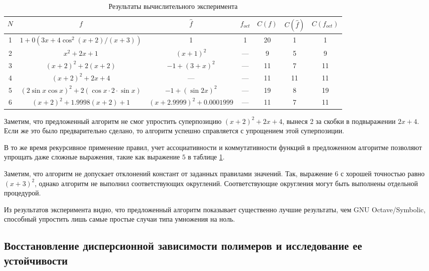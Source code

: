 \documentclass[12pt,a4paper]{article}
\begin{document}
\begin{table}[h]
  \centering
  \begin{tabular}{| c | c | c | c | c | c | c |} \hline
	$N$ & $f$														& $\hat{f}$						& $f_{oct}$	& $C(f)$	& $C(\hat{f})$  & $C(f_{oct})$	\\ \hline
	1	& $1 + 0(3x + 4 \cos^2 (x+2) / (x + 3))$					& 1								& 1			& 20		& 1				& 1				\\ \hline
	2	& $x^2 + 2x + 1$											& $(x + 1)^2$					& ---		& 9			& 5				& 9				\\ \hline
	3	& $(x+2)^2 + 2(x+2)$										& $-1 + (3 + x)^2$				& ---		& 11		& 7				& 11			\\ \hline
	4	& $(x+2)^2 + 2x + 4$										& ---							& ---		& 11		& 11			& 11			\\ \hline
	5	& $(2 \sin x \cos x)^2 + 2(\cos x \cdot 2 \cdot \sin x)$	& $-1 + (\sin 2x)^2$			& ---		& 19		& 8				& 19			\\ \hline
	6	& $(x + 2)^2 + 1.9998(x + 2) + 1$							& $(x + 2.9999)^2 + 0.0001999$	& ---		& 11		& 7				& 11			\\ \hline
  \end{tabular}
  \caption{Результаты вычислительного эксперимента}
  \label{tabl:results_1}
\end{table}

Заметим, что предложенный алгоритм не смог упростить суперпозицию
$(x+2)^2 + 2x + 4$, вынеся 2 за скобки в подвыражении $2x + 4$. Если же это
было предварительно сделано, то алгоритм успешно справляется с упрощением этой
суперпозиции.

В то же время рекурсивное применение правил, учет ассоциативности и
коммутативности функций в предложенном алгоритме позволяют упрощать даже
сложные выражения, такие как выражение $5$ в таблице \ref{tabl:results_1}.

Заметим, что алгоритм не допускает отклонений констант от заданных правилами
значений. Так, выражение $6$ с хорошей точностью равно $(x + 3)^2$, однако
алгоритм не выполнил соответствующих округлений. Соответствующие
округления могут быть выполнены отдельной процедурой.

Из результатов эксперимента видно, что предложенный алгоритм показывает
существенно лучшие результаты, чем GNU Octave/Symbolic, способный упростить
лишь самые простые случаи типа умножения на ноль.

\subsection{Восстановление дисперсионной зависимости полимеров и исследование ее устойчивости}
\end{document}
